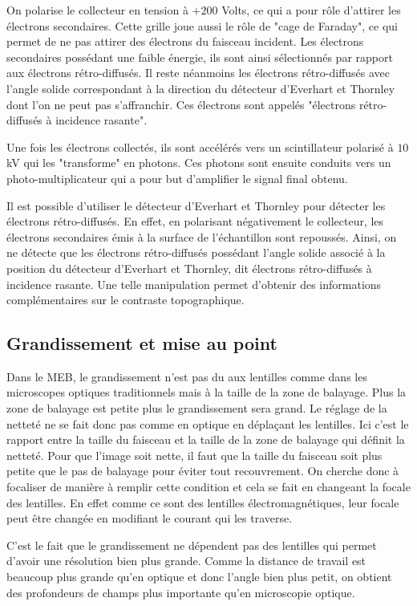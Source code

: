 \documentclass[a4paper,12pt]{article}
\newcommand\ett{Everhart et Thornley\xspace}
\begin{document}
On polarise le collecteur en tension à $+200$ Volts, ce qui a pour rôle d'attirer les électrons secondaires. 
Cette grille joue aussi le rôle de "cage de Faraday", ce qui permet de ne pas attirer des électrons du faisceau incident. 
Les électrons secondaires possédant une faible énergie, ils sont ainsi sélectionnés par rapport aux électrons rétro-diffusés.
Il reste néanmoins les électrons rétro-diffusés avec l'angle solide correspondant à la direction du détecteur d'\ett dont l'on ne peut pas s'affranchir. 
Ces électrons sont appelés "électrons rétro-diffusés à incidence rasante".

Une fois les électrons collectés, ils sont accélérés vers un scintillateur polarisé à $10$kV qui les "transforme" en photons.
Ces photons sont ensuite conduits vers un photo-multiplicateur qui a pour but d'amplifier le signal final obtenu.


Il est possible d'utiliser le détecteur d'\ett  pour détecter les électrons rétro-diffusés.
En effet, en polarisant négativement le collecteur, les électrons secondaires émis à la surface de l'échantillon sont repoussés.
Ainsi, on ne détecte que les électrons rétro-diffusés possédant l'angle solide associé à la position du détecteur d'\ett, dit électrons rétro-diffusés à incidence rasante.
Une telle manipulation permet d'obtenir des informations complémentaires sur le contraste topographique.


\subsection{Grandissement et mise au point}
Dans le MEB, le grandissement n'est pas du aux lentilles comme dans les microscopes optiques traditionnels mais à la taille de la zone de balayage. Plus la zone de balayage est petite plus le grandissement sera grand. Le réglage de la netteté ne se fait donc pas comme en optique en déplaçant les lentilles. Ici c'est le rapport entre la taille du faisceau et la taille de la zone de balayage qui définit la netteté. Pour que l'image soit nette, il faut que la taille du faisceau soit plus petite que le pas de balayage pour éviter tout recouvrement. On cherche donc à focaliser de manière à remplir cette condition et cela se fait en changeant la focale des lentilles. En effet comme ce sont des lentilles électromagnétiques, leur focale peut être changée en modifiant le courant qui les traverse.


C'est le fait que le grandissement ne dépendent pas des lentilles qui permet d'avoir une résolution bien plus grande. Comme la distance de travail est beaucoup plus grande qu'en optique et donc l'angle bien plus petit, on obtient des profondeurs de champs plus importante qu'en microscopie optique. 
\end{document}
